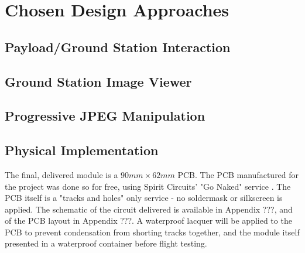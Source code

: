 \chapter{Chosen Design Approaches}




\section{Payload/Ground Station Interaction}

\section{Ground Station Image Viewer}

\section{Progressive JPEG Manipulation}

\section{Physical Implementation}

The final, delivered module is a $90mm\times62mm$ PCB. The PCB manufactured 
for the project was done so for free, using Spirit Circuits' "Go Naked"
service \cite{go-naked}. The PCB itself is a "tracks and holes" only service 
- no soldermask or silkscreen is applied. The schematic of the circuit 
delivered is available in Appendix ???, and of the PCB layout in Appendix 
???. A waterproof lacquer will be applied to the PCB to prevent condensation 
from shorting tracks together, and the module itself presented in a 
waterproof container before flight testing.

